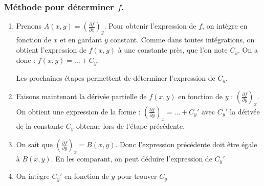 \documentclass[french]{yLectureNote}
\begin{document}
\subsubsection{Méthode pour déterminer $f$.}
\begin{enumerate}
 \item Prenons $A(x,y) = (\frac{\partial f}{\partial x})_y$. Pour obtenir l'expression de $f$, on intègre en fonction de $x$ et en gardant $y$ constant. Comme dans toutes intégrations, on obtient l'expression de $f(x,y)$ à une constante près, que l'on note $C_y$. On a donc : $f(x,y) = \dots + C_y$.

Les prochaines étapes permettent de déterminer l'expression de $C_y$.
\item Faisons maintenant la dérivée partielle de $f(x,y)$ en fonction de $y$ : $(\frac{\partial f}{\partial y})_x$. On obtient une expression de la forme : $(\frac{\partial f}{\partial y})_x = \dots + C_y'$ avec $C_y'$ la dérivée de la constante $C_y$ obtenue lors de l'étape précédente.
\item On sait que $(\frac{\partial f}{\partial y})_x = B(x,y)$. Donc l'expression précédente doit \^etre égale à $B(x,y)$. En les comparant, on peut déduire l'expression de $C_y'$

\item On intègre $C_y'$ en fonction de $y$ pour trouver $C_y$
\end{enumerate}
\end{document}
